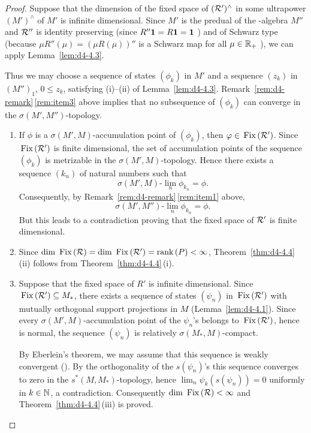 \begin{proof}
Suppose that the dimension of the fixed space of\/ 
$ (\mathcal{R}')^{\wedge} $  in some ultrapower $ (M')^{\wedge} $  of\/ $ M' $  is infinite dimensional.
Since $ M' $ is the predual of the \WA-algebra $ M'' $  and $ \mathcal{R}'' $  is identity preserving (since $ R''\mathbf{1} = R\mathbf{1} = \mathbf{1} $ ) and of Schwarz type (because $ \mu R''(\mu) = (\mu R(\mu))'' $  is a Schwarz map for all $ \mu \in \mathbb{R}_{+} $ ), we can apply Lemma~\ref{lem:d4-4.3}.

Thus we may choose a sequence of states $ (\phi_{k}) $  in $ M' $  and a sequence $ (z_{k}) $  in $ (M'')_{1}$, $ 0 \leq z_{k} $,  satisfying (i)--(ii) of Lemma~\ref{lem:d4-4.3}.
Remark~\ref{rem:d4-remark}\,\ref{rem:item3} above implies that no subsequence of\/ $ (\phi_{k}) $  can converge in the $ \sigma(M',M'') $-topology.
\begin{enumerate}[\upshape (i), wide, labelindent=.25em]
\item
If\/ $ \phi $  is a $ \sigma(M',M) $-accumulation point of\/ $ (\phi_{k}) $, then $ \phi \in \Fix{\RR'} $.
Since $ \mathop{}\mathrm{Fix}\left(\mathcal{R}'\right) $  is finite dimensional, the set of accumulation points of the sequence $ (\phi_{k}) $  is metrizable in the $ \sigma(M',M) $-topology.
Hence there exists a sequence $ (k_{n}) $  of natural numbers such that 
\[
    \sigma(M',M)\text{-}\lim_{n} \phi_{k_{n}} = \phi .
\]
Consequently, by Remark~\ref{rem:d4-remark}\,\ref{rem:item1} above, 
\[ 
    \sigma(M',M'')\text{-}\lim_{n} \phi_{k_{n}}= \phi .
\]
But this leads to a contradiction proving that the fixed space of\/ $ \mathcal{R}' $  is finite dimensional.

\item
Since $ \mathop{}\!\mathrm{dim}\, \mathop{}\mathrm{Fix}\left(\mathcal{R}\right) = \mathop{}\!\mathrm{dim}\, \mathop{}\mathrm{Fix}\left(\mathcal{R}'\right) = \mathop{}\!\mathrm{rank}\,(P) < \infty $, Theorem~\ref{thm:d4-4.4}\,(ii) follows from Theorem~\ref{thm:d4-4.4}\,(i).

\item
Suppose that the fixed space of\/ $ R' $  is infinite dimensional.
Since $ \mathop{}\mathrm{Fix}\left(\mathcal{R}'\right) \subseteq M_{*} $,  there exists a sequence of states $ (\psi_{n}) $  in $ \mathop{}\mathrm{Fix}\left(\mathcal{R}'\right) $  with mutually orthogonal support projections in $ M $  (Lemma~\ref{lem:d4-4.1}).
Since every $ \sigma(M',M) $-accumulation point of the $ \psi_{n} $'s belongs to $ \mathop{}\mathrm{Fix}\left(\mathcal{R}'\right) $, hence is normal, the sequence $ (\psi_{n}) $  is relatively $ \sigma(M_{*},M) $-compact.

By Eberlein's theorem, we may assume that this sequence is weakly convergent (\textcite{schaefer:1966}).
By the orthogonality of the $ s(\psi_{n}) $'s this sequence converges to zero in the $ s^{*}(M,M_{*}) $-topology, hence $ \lim_{n} \psi_{k}(s(\psi_{n})) = 0 $  uniformly in $ k \in \mathbb{N} $, a contradiction.
Consequently $ \mathop{}\!\mathrm{dim}\, \mathop{}\mathrm{Fix}\left(\mathcal{R}\right) < \infty $  and Theorem~\ref{thm:d4-4.4}\,(iii) is proved.


\end{enumerate}
\end{proof}
